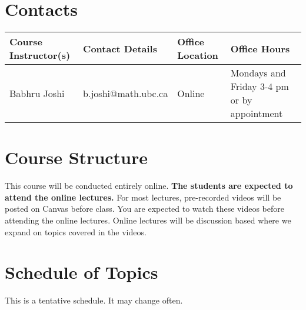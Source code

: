 \documentclass[12pt,usletter]{article} %
\begin{document}
\section*{Contacts}

\begin{tabu} to \textwidth{ | X[l] | X[l] | X[l] | X[l] | }
\hline 
{}
\textbf{Course Instructor(s)} &
\textbf{Contact Details} &
\textbf{Office Location} &
\textbf{Office Hours} \\
\hline
\relax Babhru Joshi &
\relax b.joshi@math.ubc.ca &
\relax Online &
\relax Mondays and Friday 3-4 pm or by appointment \\
%
\hline
\end{tabu}

\section*{Course Structure}

This course will be conducted entirely online. \textbf{The students are expected to attend the online lectures.} For most lectures, pre-recorded videos will be posted on Canvas before class. You are expected to watch these videos before attending the online lectures. Online lectures will be discussion based where we expand on topics covered in the videos.

\section*{Schedule of Topics}

This is a tentative schedule. It may change often.
\end{document}
